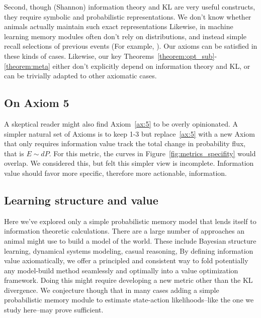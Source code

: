 \documentclass[9pt,twocolumn,twoside]{pnas-new}
\begin{document}
Second, though (Shannon) information theory and KL are very useful constructs, they require symbolic and probabilistic representations. We don't know whether animals actually maintain such exact representations %
Likewise, in machine learning memory modules often don't rely on distributions, and instead simple recall selections of previous events (For example, \cite{Min2016}). 
Our axioms can be satisfied in these kinds of cases. Likewise, our key Theorems~\ref{theorem:opt_sub}-\ref{theorem:meta} either don't explicitly depend on information theory and KL, or can be trivially adapted to other axiomatic cases.

\subsection*{On Axiom 5} 
A skeptical reader might also find Axiom~\ref{ax:5} to be overly opinionated. A simpler natural set of Axioms is to keep 1-3 but replace~\ref{ax:5} with a new Axiom  that only requires information value track the total change in probability flux, that is $E \sim dP$. For this metric, the curves in Figure~\ref{fig:metrics_specifity} would overlap. We considered this, but felt this simpler view is incomplete. Information value should favor more specific, therefore more actionable, information. 


\subsection*{Learning structure and value}
Here we've explored only a simple probabilistic memory model that lends itself to information theoretic calculations. There are a large number of approaches an animal might use to build a model of the world. These include Bayesian structure learning, dynamical systems modeling, casual reasoning, %
By defining information value axiomatically, we offer a principled and consistent way to fold potentially any model-build method seamlessly and optimally into a value optimization framework. Doing this might require developing a new metric other than the KL divergence. We conjecture though that in many cases adding a simple probabilistic memory module to estimate state-action likelihoods--like the one we study here--may prove sufficient.




\end{document}
